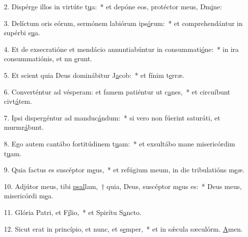2. Dispérge illos in virtúte t\uline{u}a:~* et depóne eos, protéctor meus, Dm\uline{i}ne:\par 
3. Delíctum oris eórum, sermónem labiórum ips\uline{ó}rum:~* et comprehendántur in supérbi s\uline{u}a.\par 
4. Et de exsecratióne et mendácio annuntiabúntur in consummati\uline{ó}ne:~* in ira consummatiónis, et nn \uline{e}runt.\par 
5. Et scient quia Deus dominábitur J\uline{a}cob:~* et fínim t\uline{e}rræ.\par 
6. Converténtur ad vésperam: et famem patiéntur ut c\uline{a}nes,~* et circuíbunt civt\uline{á}tem.\par 
7. Ipsi dispergéntur ad manduc\uline{á}ndum:~* si vero non fúerint saturáti, et murmr\uline{á}bunt.\par 
8. Ego autem cantábo fortitúdinem t\uline{u}am:~* et exsultábo mane misericórdim t\uline{u}am.\par 
9. Quia factus es suscéptor m\uline{e}us,~* et refúgium meum, in die tribulatións m\uline{e}æ.\par 
10. Adjútor meus, tibi \uline{psal}lam,~† quia, Deus, suscéptor m\uline{e}us es:~* Deus meus, misericórdi m\uline{e}a.\par 
11. Glória Patri, et F\uline{í}lio,~* et Spirítu S\uline{a}ncto.\par 
12. Sicut erat in princípio, et nunc, et s\uline{e}mper,~* et in sǽcula sæculórm. \uline{A}men.\par 
